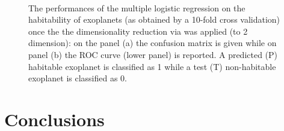 \documentclass[
12pt, %
a4paper, %
oneside, %
headinclude,footinclude, %
BCOR5mm, %
]{scrartcl}
\begin{document}
\begin{figure}[h]
  \centering
{}\\
\caption{The performances of the multiple logistic regression on the habitability of exoplanets (as obtained by a 10-fold cross validation) once the the dimensionality reduction via was applied (to 2 dimension): on the panel (a) the confusion matrix is given  while on panel (b) the ROC curve (lower panel) is reported. A predicted (P) habitable exoplanet is classified as 1 while a test (T) non-habitable exoplanet is classified as 0.}
\label{SVM+PCA_results}
\end{figure}







\clearpage

\section{Conclusions}
\end{document}
